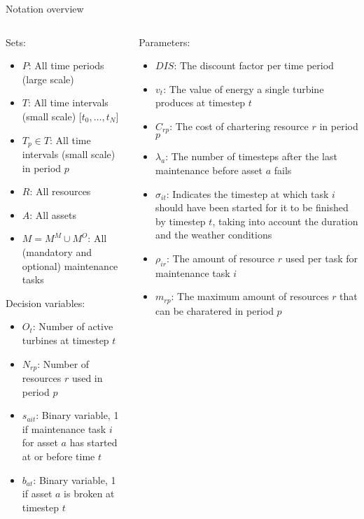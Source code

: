 \documentclass{beamer}
\begin{document}
\begin{frame}{Notation overview}
\scriptsize

\begin{columns}
\begin{column}{.48\textwidth}
Sets:
\begin{itemize}
\item $P$: All time periods (large scale)
\item $T$: All time intervals (small scale) [$t_0, \dots , t_N$]
\item $T_p \in T$: All time intervals (small scale) in period $p$
\item $R$: All resources
\item $A$: All assets
\item $M = M^M \cup M^O$: All (mandatory and optional) maintenance tasks
\end{itemize}

Decision variables:
\begin{itemize}
\item $O_{t}$: Number of active turbines at timestep $t$
\item $N_{rp}$: Number of resources $r$ used in period $p$
\item $s_{ait}$: Binary variable, 1 if maintenance task $i$ for asset $a$ has started at or before time $t$
\item $b_{at}$: Binary variable, 1 if asset $a$ is broken at timestep $t$
\end{itemize}
\end{column}

\hfill

\begin{column}{.48\textwidth}
Parameters:
\begin{itemize}
\item $DIS$: The discount factor per time period
\item $v_t$: The value of energy a single turbine produces at timestep $t$
\item $C_{rp}$: The cost of chartering resource $r$ in period $p$
\item $\lambda_a$: The number of timesteps after the last maintenance before asset $a$ fails
\item $\sigma_{it}$: Indicates the timestep at which task $i$ should have been started for it to be finished by timestep $t$, taking into account the duration and the weather conditions
\item $\rho_{ir}$: The amount of resource $r$ used per task for maintenance task $i$
\item $m_{rp}$: The maximum amount of resources $r$ that can be charatered in period $p$
\end{itemize}
\end{column}
\end{columns}

\end{frame}
\end{document}
